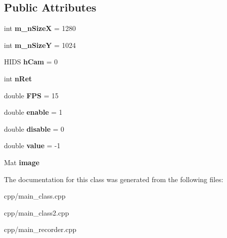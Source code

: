 \subsection*{Public Attributes}
\begin{DoxyCompactItemize}
\item 
\hypertarget{classCamera_a6b49434e72a6039007f65cc07b4b6de2}{int {\bfseries m\-\_\-n\-Size\-X} = 1280}\label{classCamera_a6b49434e72a6039007f65cc07b4b6de2}

\item 
\hypertarget{classCamera_a6f58e65dfd19b7bd59b87186dd1350c2}{int {\bfseries m\-\_\-n\-Size\-Y} = 1024}\label{classCamera_a6f58e65dfd19b7bd59b87186dd1350c2}

\item 
\hypertarget{classCamera_a8617764fa77b0bac3f5fa736af0c8ddf}{H\-I\-D\-S {\bfseries h\-Cam} = 0}\label{classCamera_a8617764fa77b0bac3f5fa736af0c8ddf}

\item 
\hypertarget{classCamera_acc9e71950b77c7290defa3bd7b8ef141}{int {\bfseries n\-Ret}}\label{classCamera_acc9e71950b77c7290defa3bd7b8ef141}

\item 
\hypertarget{classCamera_a694a56786f4b201355cb700afd5e9a49}{double {\bfseries F\-P\-S} = 15}\label{classCamera_a694a56786f4b201355cb700afd5e9a49}

\item 
\hypertarget{classCamera_a19efaab4eff17c16b8d60a9a6812baf7}{double {\bfseries enable} = 1}\label{classCamera_a19efaab4eff17c16b8d60a9a6812baf7}

\item 
\hypertarget{classCamera_ac086a9feee4fbaa4c312988ba4852885}{double {\bfseries disable} = 0}\label{classCamera_ac086a9feee4fbaa4c312988ba4852885}

\item 
\hypertarget{classCamera_a274b7eef4f0d8926d51e7d8a7e1ffe42}{double {\bfseries value} = -\/1}\label{classCamera_a274b7eef4f0d8926d51e7d8a7e1ffe42}

\item 
\hypertarget{classCamera_a02c640ded58ec70e804845a26d6a4d38}{Mat {\bfseries image}}\label{classCamera_a02c640ded58ec70e804845a26d6a4d38}

\end{DoxyCompactItemize}


The documentation for this class was generated from the following files\-:\begin{DoxyCompactItemize}
\item 
cpp/main\-\_\-class.\-cpp\item 
cpp/main\-\_\-class2.\-cpp\item 
cpp/main\-\_\-recorder.\-cpp\end{DoxyCompactItemize}
